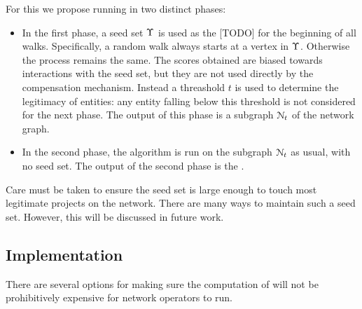 For this we propose running \osrank{} in two distinct phases:
\begin{itemize}
\item In the first phase, a seed set $\Upsilon$ is used as the [TODO] for the
  beginning of all walks. Specifically, a random walk always starts at
  a vertex in $\Upsilon$. Otherwise the process remains the same. The scores
  obtained are biased towards interactions with the seed set, but they
  are not used directly by the compensation mechanism. Instead a
  threashold $t$ is used to determine the legitimacy of entities: any
  entity falling below this threshold is not considered for the next
  phase. The output of this phase is a subgraph $\mathcal{N}_t$ of the network
  graph.
\item In the second phase, the algorithm is run on the subgraph
  $\mathcal{N}_t$ as usual, with no seed set. The output of the second
  phase is the \osrank{}.
\end{itemize}

Care must be taken to ensure the seed set is large enough to touch most
legitimate projects on the network.  There are many ways to maintain such a
seed set. However, this will be discussed in future work.

\subsection{Implementation}

There are several options for making sure the computation of \osrank{}
will not be prohibitively expensive for network operators to run.

